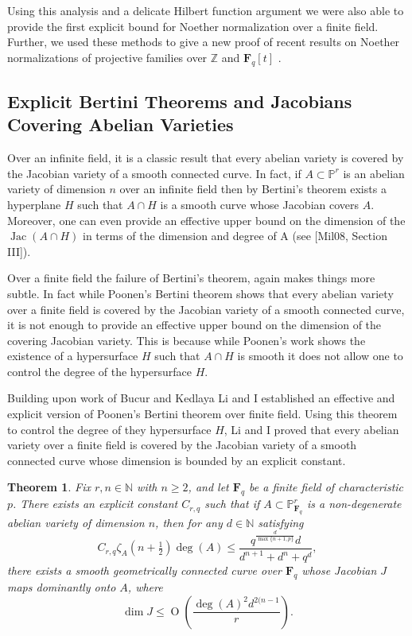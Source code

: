 \documentclass[10pt,reqno]{amsart}
\newtheorem{theorem}[lemma]{Theorem}
\theoremstyle{remark}
\newcommand{\Jac}{\operatorname{Jac}}
\newcommand{\fF}{\mathbf F}
\newcommand{\OO}{\operatorname{O}}
\newcommand{\N}{\mathbb{N}}
\renewcommand{\P}{\mathbb{P}}
\newcommand{\Z}{\mathbb{Z}}
\begin{document}
Using this analysis and a delicate Hilbert function argument we were also able to provide the first explicit bound for Noether normalization over a finite field. Further, we used these methods to give a new proof of recent results on Noether normalizations of projective families over $\Z$ and $\fF_{q}[t]$ \cite{gabberLiuLorenzini15, cmbpt}.



\subsection{Explicit Bertini Theorems and Jacobians Covering Abelian Varieties}

Over an infinite field, it is a classic result that every abelian variety is covered by the Jacobian variety of a smooth connected curve. In fact, if $A\subset \P^r$ is an abelian variety of dimension $n$ over an infinite field then by Bertini's theorem exists a hyperplane $H$ such that $A\cap H$ is a smooth curve whose Jacobian covers $A$. Moreover, one can even provide an effective upper bound on the dimension of the $\Jac(A\cap H)$ in terms of the dimension and degree of A (see [Mil08, Section III]).

Over a finite field the failure of Bertini's theorem, again makes things more subtle. In fact while Poonen's Bertini theorem shows that every abelian variety over a finite field is covered by the Jacobian variety of a smooth connected curve, it is not enough to provide an effective upper bound on the dimension of the covering Jacobian variety. This is because while Poonen's work shows the existence of a hypersurface $H$ such that $A\cap H$ is smooth it does not allow one to control the degree of the hypersurface $H$. 

Building upon work of Bucur and Kedlaya \cite{bucurKedlaya12} Li and I established an effective and explicit version of Poonen's Bertini theorem over finite field. Using this theorem to control the degree of they hypersurface $H$, Li and I proved that every abelian variety over a finite field is covered by the Jacobian variety of a smooth connected curve whose dimension is bounded by an explicit constant. 

\begin{theorem}
Fix $r,n\in \N$ with $n\geq2$, and let $\fF_{q}$ be a finite field of characteristic $p$. There exists an explicit constant $C_{r,q}$ such that if $A\subset \P^{r}_{\fF_q}$ is a non-degenerate abelian variety of dimension $n$, then for any $d\in \N$ satisfying 
\[
C_{r,q}\zeta_{A}\left(n+\tfrac{1}{2}\right) \deg(A) \leq  \frac{q^{\frac{d}{\max\{n+1,p\}}}d}{d^{n+1}+d^n+q^{d}},
\]
there exists a smooth geometrically connected curve over $\fF_{q}$ whose Jacobian $J$ maps dominantly onto $A$, where 
\[
\dim J\leq 
\OO\left(\frac{ \deg(A)^2 d^{2(n-1}}{r}\right).
\]
\end{theorem} 
\end{document}
